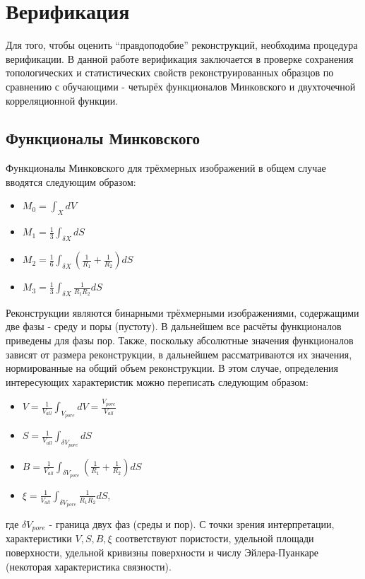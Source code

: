 \clearpage
\section{Верификация}

	Для того, чтобы оценить ``правдоподобие'' реконструкций, необходима процедура верификации. В данной работе верификация заключается в проверке сохранения топологических и статистических свойств реконструированных образцов по сравнению с обучающими - четырёх функционалов Минковского и двухточечной корреляционной функции.
	
	\subsection{Функционалы Минковского}
		Функционалы Минковского для трёхмерных изображений в общем случае вводятся следующим образом:
		\begin{itemize}
			\item $ \displaystyle M_0 = \int_{X} dV $
			\item $ \displaystyle M_1 = \frac{1}{3} \int_{\delta X} dS $
			\item $ \displaystyle M_2 = \frac{1}{6} \int_{\delta X} \left ( \frac{1}{R_1} + \frac{1}{R_2} \right ) dS$
			\item $\displaystyle M_3 = \frac{1}{3} \int_{\delta X} \frac{1}{R_1 R_2} dS $
		\end{itemize}
		Реконструкции являются бинарными трёхмерными изображениями, содержащими две фазы - среду и поры (пустоту). В дальнейшем все расчёты функционалов приведены для фазы пор. Также, поскольку абсолютные значения функционалов зависят от размера реконструкции, в дальнейшем рассматриваются их значения, нормированные на общий объем реконструкции. В этом случае, определения интересующих характеристик можно переписать следующим образом:
		\begin{itemize}
			\item $ \displaystyle V = \frac{1}{V_{all}} \int_{V_{pore}} dV = \frac{V_{pore}}{V_{all}}$
			\item $ \displaystyle S = \frac{1}{V_{all}} \int_{\delta V_{pore}} dS $
			\item $ \displaystyle B = \frac{1}{V_{all}} \int_{\delta V_{pore}} \left ( \frac{1}{R_1} + \frac{1}{R_2} \right ) dS$
			\item $\displaystyle \xi = \frac{1}{V_{all}} \int_{\delta V_{pore}} \frac{1}{R_1 R_2} dS, $
		\end{itemize}
		где $\delta V_{pore}$ - граница двух фаз (среды и пор).
		С точки зрения интерпретации, характеристики $ V, S, B, \xi $ соответствуют пористости, удельной площади поверхности, удельной кривизны поверхности и числу Эйлера-Пуанкаре (некоторая характеристика связности).
		
